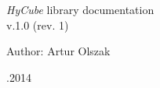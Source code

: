 \documentclass[a4paper,onecolumn,oneside,12pt]{mwrep}
\begin{document}
\begin{titlepage}	%
	
	\fontsize{24pt}{18pt}\selectfont
	\emph{HyCube} library documentation \\
	
	\fontsize{16pt}{14pt}\selectfont
	v.1.0 (rev. 1)
	\vspace*{25\baselineskip}
	
	
	\fontsize{14pt}{15pt}\selectfont
	Author: Artur Olszak\\
	\vspace*{1\baselineskip}
	
	
	\begin{flushright}
	\fontsize{10pt}{15pt}.2014
	\end{flushright}
	
\end{titlepage}





\newpage


\setcounter{page}{2}



\tableofcontents




\end{document}
